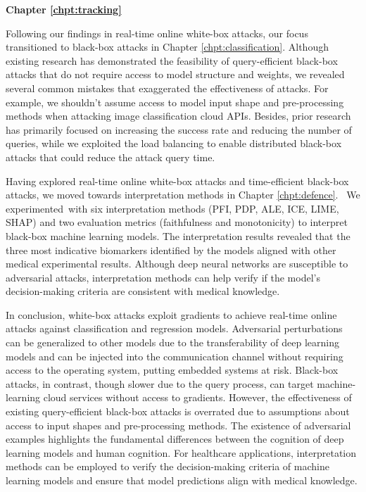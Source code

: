 \textbf{Chapter \ref{chpt:tracking}} \color{gray}\lipsum[1-1][1-9]\color{black}

Following our findings in real-time online white-box attacks, our focus transitioned to black-box attacks in Chapter \ref{chpt:classification}. Although existing research has demonstrated the feasibility of query-efficient black-box attacks that do not require access to model structure and weights, we revealed several common mistakes that exaggerated the effectiveness of attacks. For example, we shouldn't assume access to model input shape and pre-processing methods when attacking image classification cloud APIs. Besides,  prior research has primarily focused on increasing the success rate and reducing the number of queries, while we exploited the load balancing to enable distributed black-box attacks that could reduce the attack query time.

Having explored real-time online white-box attacks and time-efficient black-box attacks, we moved towards interpretation methods in Chapter \ref{chpt:defence}.  We experimented with six interpretation methods (PFI, PDP, ALE, ICE, LIME, SHAP) and two evaluation metrics (faithfulness and monotonicity) to interpret black-box machine learning models. The interpretation results revealed that the three most indicative biomarkers identified by the models aligned with other medical experimental results. Although deep neural networks are susceptible to adversarial attacks, interpretation methods can help verify if the model's decision-making criteria are consistent with medical knowledge.

In conclusion, white-box attacks exploit gradients to achieve real-time online attacks against classification and regression models. Adversarial perturbations can be generalized to other models due to the transferability of deep learning models and can be injected into the communication channel without requiring access to the operating system, putting embedded systems at risk. Black-box attacks, in contrast, though slower due to the query process, can target machine-learning cloud services without access to gradients. However, the effectiveness of existing query-efficient black-box attacks is overrated due to assumptions about access to input shapes and pre-processing methods. The existence of adversarial examples highlights the fundamental differences between the cognition of deep learning models and human cognition. For healthcare applications, interpretation methods can be employed to verify the decision-making criteria of machine learning models and ensure that model predictions align with medical knowledge.

